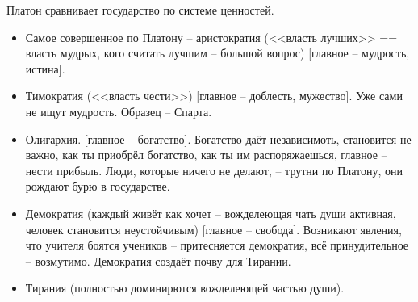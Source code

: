 \documentclass[a4paper, 12pt]{book} %
\begin{document}
Платон сравнивает государство по системе ценностей.

\begin{itemize}
\item Самое совершенное по Платону -- аристократия (<<власть лучших>> == власть мудрых, кого считать лучшим -- большой вопрос) [главное -- мудрость, истина].
\item Тимократия (<<власть чести>>) [главное -- доблесть, мужество]. Уже сами не ищут мудрость. Образец -- Спарта.
\item Олигархия. [главное -- богатство]. Богатство даёт независимоть, становится не важно, как ты приобрёл богатство, как ты им распоряжаешься, главное -- нести прибыль. Люди, которые ничего не делают, -- трутни по Платону, они рождают бурю в государстве.
\item Демократия (каждый живёт как хочет -- вожделеющая чать души активная, человек становится неустойчивым) [главное -- свобода]. Возникают явления, что учителя боятся учеников -- притесняется демократия, всё принудительное -- возмутимо. Демократия создаёт почву для Тирании.
\item Тирания (полностью доминирются вожделеющей частью души).
\end{itemize}
\end{document}

